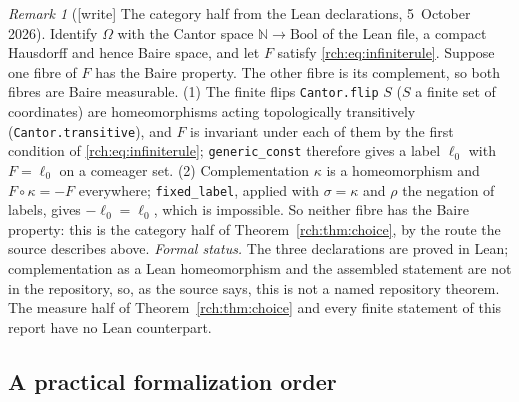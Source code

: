 \documentclass[11pt]{article}
\theoremstyle{definition}
\theoremstyle{remark}
\newtheorem{remark}[theorem]{Remark}
\newcommand{\N}{\mathbb N}
\newcommand{\file}[1]{\nolinkurl{#1}}
\begin{document}
\begin{remark}[{[write]} The category half from the Lean declarations, 5~October 2026]
\label{rch:rem:lean}
Identify $\Omega$ with the Cantor space $\N\to\mathrm{Bool}$ of the Lean
file, a compact Hausdorff and hence Baire space, and let $F$ satisfy
\eqref{rch:eq:infiniterule}. Suppose one fibre of $F$ has the Baire
property. The other fibre is its complement, so both fibres are Baire
measurable. (1) The finite flips \file{Cantor.flip} $S$ ($S$ a finite set
of coordinates) are homeomorphisms
acting topologically transitively (\file{Cantor.transitive}), and $F$ is
invariant under each of them by the first condition of
\eqref{rch:eq:infiniterule}; \file{generic_const} therefore gives a label
$\ell_0$ with $F=\ell_0$ on a comeager set. (2) Complementation $\kappa$ is a
homeomorphism and $F\circ\kappa=-F$ everywhere; \file{fixed_label}, applied
with $\sigma=\kappa$ and $\rho$ the negation of labels, gives
$-\ell_0=\ell_0$, which is impossible. So neither fibre has the Baire
property: this is the category half of Theorem~\ref{rch:thm:choice}, by the
route the source describes above. \emph{Formal status.} The three
declarations are proved in Lean; complementation as a Lean homeomorphism and
the assembled statement are not in the repository, so, as the source says,
this is not a named repository theorem. The measure half of
Theorem~\ref{rch:thm:choice} and every finite statement of this report have
no Lean counterpart.
\end{remark}

\subsection{A practical formalization order}
\end{document}
